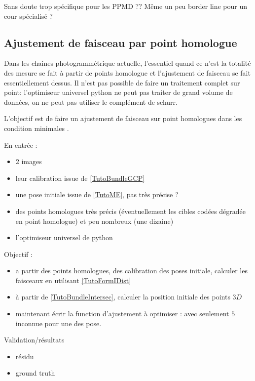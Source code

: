 Sans doute trop spécifique pour les PPMD ??  Même un peu border line pour un cour spécialisé ?


\subsection{Ajustement de faisceau par point homologue}

Dans les chaines photogrammétrique actuelle, l'essentiel quand ce n'est la totalité des 
mesure se fait à partir de points homologue et l'ajustement de faisceau se fait
essentiellement dessus.  Il n'est pas possible de faire un traitement complet sur point:
l'optimiseur universel python ne peut pas traiter de grand volume de données, on ne peut pas 
utiliser le complément de schurr.

L'objectif est de faire un ajustement de faisceau sur point homologues dans les condition minimales .


En entrée :

\begin{itemize}
    \item 2 images 
    \item leur calibration issue de \ref{TutoBundleGCP}
    \item une pose initiale issue de  \ref{TutoME}, pas très précise ?
    \item des points homologues très précis (éventuellement 
	    les cibles codées dégradée en point homologue) et peu nombreux (une dizaine)
    \item l'optimiseur universel de python
\end{itemize}

Objectif : 
\begin{itemize}
    \item a partir des points homologues, des calibration des poses initiale,
          calculer les faisceaux en utilisant  \ref{TutoFormIDist}

     \item  à partir de \ref{TutoBundleIntersec}, calculer la position initiale des points $3D$

     \item maintenant écrir la function d'ajustement à optimiser : avec seulement $5$ inconnue
           pour une des pose.
\end{itemize}

Validation/résultats 

\begin{itemize}
    \item résidu 
    \item ground truth
\end{itemize}

